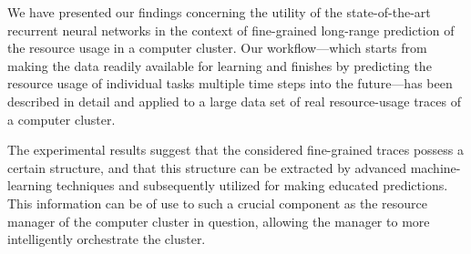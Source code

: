 We have presented our findings concerning the utility of the state-of-the-art
recurrent neural networks in the context of fine-grained long-range prediction
of the resource usage in a computer cluster. Our workflow---which starts from
making the data readily available for learning and finishes by predicting the
resource usage of individual tasks multiple time steps into the future---has
been described in detail and applied to a large data set of real resource-usage
traces of a computer cluster.

The experimental results suggest that the considered fine-grained traces possess
a certain structure, and that this structure can be extracted by advanced
machine-learning techniques and subsequently utilized for making educated
predictions. This information can be of use to such a crucial component as the
resource manager of the computer cluster in question, allowing the manager to
more intelligently orchestrate the cluster.
